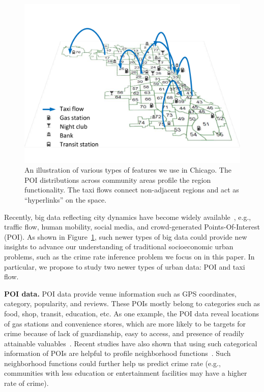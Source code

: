 \begin{figure}[t]
\centering
\includegraphics[width=0.8\linewidth]{fig/demo-kdd16.pdf}
\caption{An illustration of various types of features we use in Chicago. The POI distributions across community areas profile the region functionality. The taxi flows connect non-adjacent regions and act as ``hyperlinks'' on the space.}
\label{fig:demo}
\vspace{-3mm}
\end{figure}

Recently, big data reflecting city dynamics have become widely available~\cite{ZCWY14}, e.g., traffic flow, human mobility, social media, and crowd-generated Points-Of-Interest (POI). As shown in Figure~\ref{fig:demo}, such newer types of big data could provide new insights to advance our understanding of traditional socioeconomic urban problems, such as the crime rate inference problem we focus on in this paper. In particular, we propose to study two newer types of urban data: POI and taxi flow. 

\textbf{POI data.} POI data provide venue information such as GPS coordinates, category, popularity, and reviews. These POIs mostly belong to categories such as food, shop, transit, education, etc. As one example, the POI data reveal locations of gas stations and convenience stores, which are more likely to be targets for crime because of lack of guardianship, easy to access, and presence of readily attainable valuables~\cite{EJWD15}. Recent studies have also shown that using such categorical information of POIs are helpful to profile neighborhood functions~\cite{YZX12}. Such neighborhood functions could further help us predict crime rate (e.g., communities with less education or entertainment facilities may have a higher rate of crime). 

